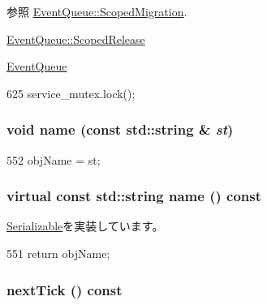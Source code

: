 \begin{DoxySeeAlso}{参照}
\hyperlink{classEventQueue_1_1ScopedMigration}{EventQueue::ScopedMigration}. 

\hyperlink{classEventQueue_1_1ScopedRelease}{EventQueue::ScopedRelease} 

\hyperlink{classEventQueue}{EventQueue} 
\end{DoxySeeAlso}



\begin{DoxyCode}
625 { service_mutex.lock(); }
\end{DoxyCode}
\hypertarget{classEventQueue_a413b79e026328fa4210d327d1958bd12}{
\subsubsection[{name}]{\setlength{\rightskip}{0pt plus 5cm}void name (const std::string \& {\em st})}}
\label{classEventQueue_a413b79e026328fa4210d327d1958bd12}



\begin{DoxyCode}
552 { objName = st; }
\end{DoxyCode}
\hypertarget{classEventQueue_adbcff144e5e199d332a1352af1798148}{
\subsubsection[{name}]{\setlength{\rightskip}{0pt plus 5cm}virtual const std::string name () const}}
\label{classEventQueue_adbcff144e5e199d332a1352af1798148}


\hyperlink{classSerializable_a2d319721a65496069642871a52e47056}{Serializable}を実装しています。


\begin{DoxyCode}
551 { return objName; }
\end{DoxyCode}
\hypertarget{classEventQueue_ac7fc06f25478db3060a43a096e023243}{
\subsubsection[{nextTick}]{ nextTick () const}}
\label{classEventQueue_ac7fc06f25478db3060a43a096e023243}



